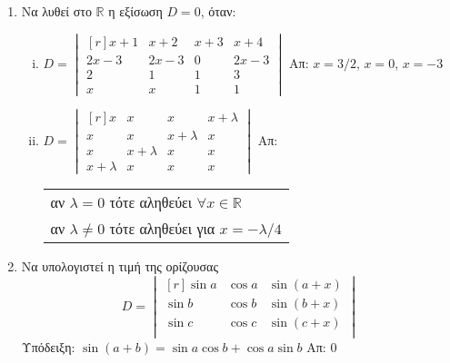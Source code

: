 




\pagestyle{askhseis}



\begin{center}
\minibox{\large\bfseries\textcolor{Col1}{Ορίζουσες}}
\end{center}

\vspace{\baselineskip}

\begin{enumerate}
  \item Να λυθεί στο $\mathbb{R}$ η εξίσωση $ D=0 $, όταν:
    \begin{enumerate}[i)]
      \item 
        $
        D = 
        \begin{vmatrix*}[r]
          x+1 & x+2 & x+3 & x+4 \\
          2x-3 & 2x-3 & 0 & 2x-3 \\
          2 & 1 & 1 & 3 \\
          x & x & 1 & 1
        \end{vmatrix*} 
        $
        \hfill Απ: $ x=3/2 $, $x=0$, $ x=-3 $   
      \item 
        $
        D=
        \begin{vmatrix*}[r]
          x & x & x & x + \lambda \\
          x & x & x+ \lambda & x \\
          x & x+ \lambda & x & x \\
          x+ \lambda & x & x & x 
        \end{vmatrix*}
        $
        \hfill Απ:
        \begin{tabular}{l}
          αν $\lambda =0$ τότε αληθεύει $ \forall x \in \mathbb{R} $ \\
          αν $\lambda \neq 0$ τότε αληθεύει για $ x=- \lambda /4 $ 
        \end{tabular} 
    \end{enumerate}

  \item Να υπολογιστεί η τιμή της ορίζουσας
    \[
      D = 
      \begin{vmatrix*}[r]
        \sin{a} & \cos{a} & \sin{(a+x)} \\
        \sin{b} & \cos{b} & \sin{(b+x)} \\
        \sin{c} & \cos{c} & \sin{(c+x)} \\
      \end{vmatrix*} 
    \]
    \hfill \textcolor{Col2}{Υπόδειξη:} 
    $ \sin{(a+b) = \sin{a} \cos{b} + \cos{a} \sin{b}} $ \quad Απ: $ 0 $  


\end{enumerate}

